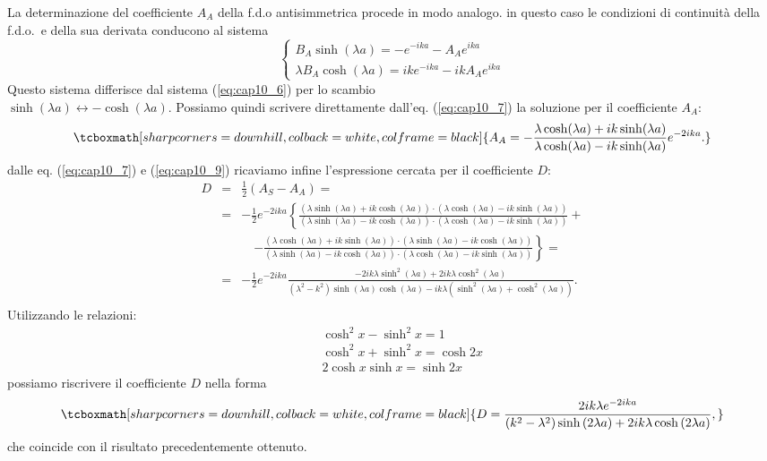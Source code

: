 \documentclass[a4paper,12pt,oneside]{book}
\begin{document}
La determinazione del coefficiente $A_A$ della f.d.o antisimmetrica procede in modo analogo. in questo caso le condizioni di continuità della f.d.o.~e della sua derivata conducono al sistema
	\begin{equation}
		\begin{cases}
		\displaystyle{B_A \sinh (\lambda a) = -e^{-ika}- A_A e^{ika}}\\
		\displaystyle{\lambda B_A \cosh (\lambda a) = ik e^{-ika}- ikA_A e^{ika}}
		\end{cases}
	\label{eq:cap10_8}
	\end{equation}
Questo sistema differisce dal sistema (\ref{eq:cap10_6}) per lo scambio\\ $\sinh (\lambda a) \leftrightarrow -\cosh (\lambda a)$. Possiamo quindi scrivere direttamente dall'eq. (\ref{eq:cap10_7}) la soluzione per il coefficiente $A_A$:
	\begin{equation}
		\tcboxmath[sharp corners=downhill, colback=white, colframe=black]{
			A_A=-\frac{\lambda \cosh (\lambda a)+ik \sinh (\lambda a)}{\lambda \cosh (\lambda a)-ik \sinh (\lambda a)}e^{-2ika}.
			}
	\label{eq:cap10_9}
	\end{equation}
dalle eq. (\ref{eq:cap10_7}) e (\ref{eq:cap10_9}) ricaviamo infine l'espressione cercata per il coefficiente $D$:
	\begin{eqnarray}
		D&=&\frac{1}{2}\left( A_S - A_A \right)= \nonumber \\
		&=& -\frac{1}{2}e^{-2ika}\left\lbrace \frac{\left( \lambda \sinh (\lambda a)+ ik \cosh (\lambda a )\right)\cdot\left( \lambda \cosh (\lambda a)- ik \sinh (\lambda a )\right)}{\left( \lambda\sinh ( \lambda a )-ik \cosh (\lambda a )\right)\cdot\left(\lambda \cosh ( \lambda a )-ik \sinh (\lambda a )\right)}\right. +\nonumber \\
		& &\quad \left. -\frac{\left( \lambda \cosh (\lambda a)+ ik \sinh (\lambda a )\right)\cdot \left( \lambda \sinh (\lambda a)- ik \cosh (\lambda a )\right)}{(\lambda \sinh (\lambda a)- ik\cosh (\lambda a )) \cdot (\lambda \cosh (\lambda a ) - ik \sinh (\lambda a ))}\right\rbrace= \nonumber \\
		&=& -\frac{1}{2}e^{-2ika} \frac{-2ik\lambda \sinh ^2 (\lambda a) + 2ik \lambda \cosh ^2 (\lambda a)}{ \left(\lambda ^2 - k^2 \right) \sinh (\lambda a ) \cosh (\lambda a) - ik\lambda \left(\sinh ^2 (\lambda a) + \cosh ^2 (\lambda a ) \right)}.\nonumber \\
	\end{eqnarray}
Utilizzando le relazioni:
	\begin{eqnarray}
		& &\cosh ^2 x - \sinh ^2 x=1 \nonumber \\
		& &\cosh ^2 x + \sinh ^2 x=\cosh 2x  \\
		& &2 \cosh  x \sinh  x=\sinh 2x \nonumber 
	\end{eqnarray}
possiamo riscrivere il coefficiente $D$ nella forma
	\begin{equation}
		\tcboxmath[sharp corners=downhill, colback=white, colframe=black]{	
			D=\frac{2ik\lambda e^{-2ika}}{\left(k^2-\lambda^2\right)\sinh \left(2\lambda a\right)+2ik\lambda \cosh\left(2\lambda a\right)},
			}
	\end{equation}
che coincide con il risultato precedentemente ottenuto.
\end{document}
